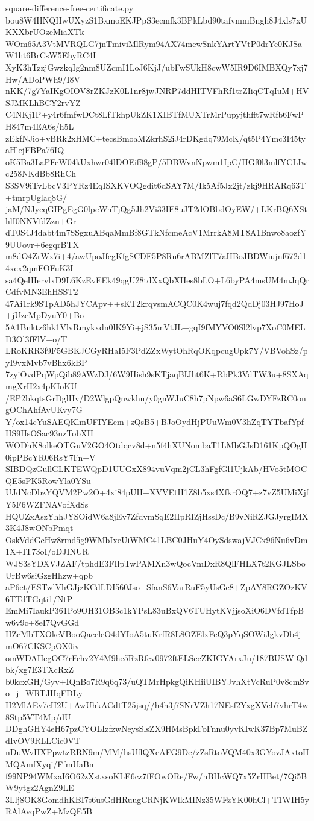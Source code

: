 \documentclass[11pt]{article}
\theoremstyle{definition}
\theoremstyle{remark}
\begin{document}
\begin{filecontents*}[overwrite]{square-difference-free-certificate.py}
bou8W4HNQHwUXyzS1BxmoEKJPpS3ecmfk3BPkLbd90tafvmmBngh8J4xls7xUKXXbrUOzeMiaXTk
WOm65A3VtMVRQLG7jnTmiviMlRym94AX74mewSnkYArtYVtP0drYe0KJSaW1ht6BrCsW5EhyRC4I
XyK3hTzzjGwzkqIg2nm8UZcmI1LoJ6KjJ/ubFwSUkH8cwW5IR9D6IMBXQy7xj7Hw/ADoPWh9/I8V
nKK/7g7YaIKgOIOV8rZKJzK0L1nr8jwJNRP7ddHITVFhRf1trZIiqCTqIuM+HVSJMKLhBCY2rvYZ
C4NKj1P+y4r6fmfwDCt8LfTkhpUkZK1XIBTfMUXTrMrPupyjthfft7wRfb6FwPH847m4EA6s/h5L
zEkfNJio+vBRk2xHMC+tecsBmoaMZkrhS2iJ4rDKgdq79McK/qt5P4Ymc3I45tyaHlejFBPa76IQ
oK5Ba3LaPFcW04kUxhwr04lDOEif98gP/5DBWvnNpwm1IpC/HGf0l3mlfYCLIwc258NKdBb8RhCh
S3SV9iTvLbcV3PYRz4EqISXKVOQgdit6dSAY7M/Ik5Af5Jx2jt/zkj9HRARq63T+tmrpUglaq8G/
jaM/NJycqGIPgEgG0lpcWnTjQg5Jh2Vi33IE8uJT2dOBbdOyEW/+LKrBQ6XSthlI0NNVfdZzn+Gr
dT0S4J4dabt4m7SSgxuABqaMmBf8GTkNfcmeAcV1MrrkA8MT8A1Bnwo8aozfY9UUovr+6egqrBTX
m8dO4ZrWx7i+4/awUpoJfcgKfgSCDF5P8Ru6rABMZlT7aHBoJBDWiujnf672d14xex2qmFOFuK3I
sa4QeHIervlxD9L6KzEvEEk49qgU28tdXxQbXHes8bLO+L6byPA4msUM4mJqQrCdfvMN3EhHSST2
47Ai1rk9STpAD5hJYCApv++sKT2krqvsmACQC0K4wuj7fqd2QdDj03HJ97HoJ+jUzeMpDyuY0+Bo
5A1Bnktz6hk1VlvRmykxdn0lK9Yi+jS35mVtJL+gqI9fMYVO0Sl2lvp7XoC0MELD3Ol3fFlV+o/T
LRoKRR3f9F5GBKJCGyRHaI5F3PdZZxWytOhRqOKqpcugUpk7Y/VBVohSz/pyI9vxMvb7vBhx6kBP
7zyiOvdPqWpQib89AWzDJ/6W9Hish9sKTjaqBIJht6K+RbPk3VdTW3u+8SXAqmgXrII2x4pKIoKU
/EP2bkqtsGrDglHv/D2WlgpQnwkhu/y0gnWJuC8h7pNpw6aS6LGwDYFzRC0ongOChAhfAvUKvy7G
Y/ox14cYuSAEQKlmUFIYEem+zQsB5+BJoOydHjPUuWm0V3hZqTYTbafYpfHS9HsOSac93nzTobXH
WODhK8olkeOTGuV2GO4Otdqcv8d+n5f4hXUNombaT1LMbGJsD161KpQOgH0ipPBcYR06RsY7Fn+V
SIBDQzGullGLKTEWQpD1UUGxX894vuVqm2jCL3hFgfGl1UjkAb/HVo5tMOCQE5sPK5RowYla0YSu
UJdNcDbzYQVM2Pw2O+4xi84pUH+XVVEtH1Z8b5xs4XfkrOQ7+z7vZ5UMiXjfY5F6WZFNAVofXdSs
HQUZxAszYhhJYSOidW6a8jEv7ZfdvmSqE2IIpRIZjHssDc/B9vNiRZJGJyrgIMX3K4J8wONbPmqt
OskVddGcHw8rmd5g9WMbIxeUiWMC41LBC0JHuY4OySdswajVJCx96Nu6vDm1X+IT73oI/oDJINUR
WJS3sYDXVJZAF/tphdE3FIlpTwPAMXn3wQocVmDxR8QlFHLX7t2KGJLSboUrBw6siGzgHhzw+qpb
aP6et/ESTwlVhGJjzKCdLDI560Jso+SfanS6VarRuF5yUsGe8+ZpAY8RGZOzKV6TTdTGqti1/NtP
EmMi7IaukP361Po9OH31OB3c1kYPsL83uBxQV6TUHytKVjjsoXiO6DVfdTfpBw6v9c+8eI7QvGGd
HZcMbTXOkeVBooQaeeleO4dYIoA5tuKrfR8L8OZElxFcQ3pYqSOWiJgkvDb4j+mO67CKSCpOX0iv
omWDAHegOC7rFchv2Y4M9he5RzRfcv0972ftELSccZKIGYArxJu/187BUSWiQdbk/xg7E3TXcRxZ
b0kcxGH/Gyv+IQnBo7R9q6q73/uQTMrHpkgQiKHiiUIBYJvhXtVcRuP0v8cmSvo+j+WRTJHqFDLy
H2MlAEv7eH2U+AwUhkACdtT25jsq//h4h3j7SNrVZh17NEsf2YxgXVeb7vhrT4w8Stp5VT4Mp/dU
DDghGHY4eH67pzCYOLIzfzwNeysSlsZX9HMsBpkFoFnnu0yvKIwK37Bp7MuBZdIvOV9RLLCic0VT
nDuWvHXPpwtzRRN9m/MM/hsUflQXeAFG9De/zZsRtoVQM40x3GYovJAxtoHMQAmfXyqi/FfmUaBn
f99NP94WMxaI6O62zXstxsoKLE6cz7fFOwORe/Fw/nBHcWQ7x5ZrHBet/7Qi5BW9ytgz2AgnZ9LE
3Llj8OK8GomdhKBI7s6usGdHRuugCRNjKWlkMINz35WFzYK00hCl+T1WIH5yRAlAvqPwZ+MzQE5B

\end{filecontents*}
\end{document}
